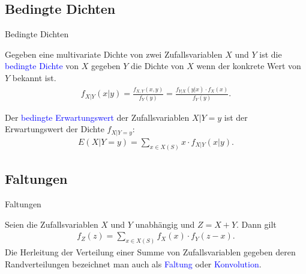 \documentclass{beamer}
\def\spadding{\vspace{0.25cm}}
\def\b{\textcolor{blue}}
\begin{document}
\subsection{Bedingte Dichten}
\begin{frame}{Bedingte Dichten}
    \begin{definition}
        Gegeben eine multivariate Dichte von zwei Zufallsvariablen $X$ und $Y$ ist die \b{bedingte Dichte} von $X$ gegeben $Y$ die Dichte von $X$ wenn der konkrete Wert von $Y$ bekannt ist.
        \begin{align*}
            f_{X|Y}(x|y) = \frac{f_{X,Y}(x,y)}{f_Y(y)} = \frac{f_{Y|X}(y|x) \cdot f_X(x)}{f_Y(y)}.
        \end{align*}\pause\par\spadding
        Der \b{bedingte Erwartungswert} der Zufallsvariablen $X|Y=y$ ist der Erwartungswert der Dichte $f_{X|Y=y}$:
        \begin{align*}
            E(X|Y=y) = \sum_{x \in X(S)} x \cdot f_{X|Y}(x|y).
        \end{align*}
    \end{definition}
\end{frame}

\subsection{Faltungen}
\begin{frame}{Faltungen}
    \begin{definition}
        Seien die Zufallsvariablen $X$ und $Y$ unabhängig und $Z = X + Y$. Dann gilt
        \begin{align*}
            f_Z(z) = \sum_{x \in X(S)} f_X(x) \cdot f_Y(z - x).
        \end{align*}\pause
        Die Herleitung der Verteilung einer Summe von Zufallsvariablen gegeben deren Randverteilungen bezeichnet man auch als \b{Faltung} oder \b{Konvolution}.
    \end{definition}
\end{frame}
\end{document}
